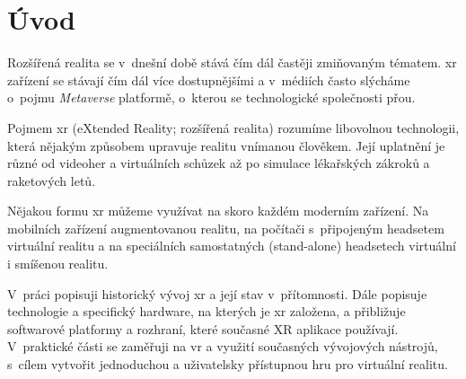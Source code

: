 \chapter*{Úvod}
Rozšířená realita se v~dnešní době stává čím dál častěji zmiňovaným tématem. \gls{xr} zařízení se stávají čím dál více dostupnějšími a v~médiích často slýcháme o~pojmu \textit{Metaverse} \poml platformě, o~kterou se technologické společnosti přou.

Pojmem \gls{xr} (eXtended Reality; rozšířená realita) rozumíme libovolnou technologii, která nějakým způsobem upravuje realitu vnímanou člověkem. Její uplatnění je různé \poml od videoher a virtuálních schůzek až po simulace lékařských zákroků a raketových letů. \cite{muni_kybernetika}

Nějakou formu \gls{xr} můžeme využívat na skoro každém moderním zařízení. Na mobilních zařízení augmentovanou realitu, na počítači s~připojeným headsetem virtuální realitu a na speciálních samostatných (stand-alone) headsetech virtuální i smíšenou realitu.

V~práci popisuji historický vývoj \gls{xr} a její stav v~přítomnosti. Dále popisuje technologie a specifický hardware, na kterých je \gls{xr} založena, a přibližuje softwarové platformy a rozhraní, které současné XR aplikace používají. V~praktické části se zaměřuji na \gls{vr} a využití současných vývojových nástrojů, s~cílem vytvořit jednoduchou a uživatelsky přístupnou hru pro virtuální realitu.